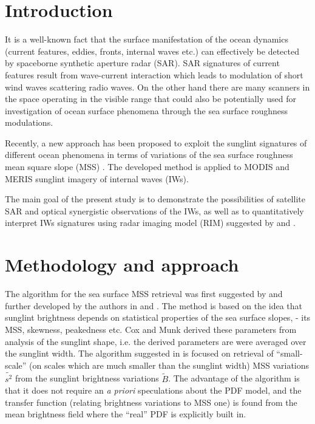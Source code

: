 \documentclass[preprint,authoryear,12pt]{elsarticle}
\begin{document}
\linenumbers

\section{Introduction}
\label{intro}

It is a well-known fact that the surface manifestation of the ocean dynamics (current features, eddies, fronts, internal waves etc.) can effectively be detected by spaceborne synthetic aperture radar (SAR). SAR signatures of current features result from wave-current interaction which leads to modulation of short wind waves scattering radio waves. On the other hand there are many scanners in the space operating in the visible range that could also be potentially used for investigation of ocean surface phenomena through the sea surface roughness modulations.

Recently, a new approach has been proposed to exploit the sunglint signatures of different ocean phenomena in terms of variations of the sea surface roughness mean square slope (MSS) \cite{Kudryavtsev2012a}. The developed method is applied to MODIS and MERIS sunglint imagery of internal waves (IWs). 

The main goal of the present study is to demonstrate the possibilities of satellite SAR and optical synergistic observations of the IWs, as well as to quantitatively interpret IWs signatures using radar imaging model (RIM) suggested by \cite{Kudryavtsev2005} and \cite{Johannessen2005}.


\section{Methodology and approach}

The algorithm for the sea surface MSS retrieval was first suggested by \cite{Myasoedov2010a} and further developed by the authors in \citep{Kudryavtsev2012a} and \citep{Kudryavtsev2012b}. The method is based on the idea that sunglint brightness depends on statistical properties of the sea surface slopes, - its MSS, skewness, peakedness etc. Cox and Munk \cite{Cox1954} derived these parameters from analysis of the sunglint shape, i.e. the derived parameters are were averaged over the sunglint width. The algorithm suggested in \citep{Kudryavtsev2012a} is focused on retrieval of ``small-scale'' (on scales which are much smaller than the sunglint width) MSS variations $\tilde{s^2}$ from the sunglint brightness variations $\tilde{B}$. The advantage of the algorithm is that it does not require an \textit{a priori} speculations about the PDF model, and the transfer function (relating brightness variations to MSS one) is found from the mean brightness field where the ``real'' PDF is explicitly built in.
\end{document}
